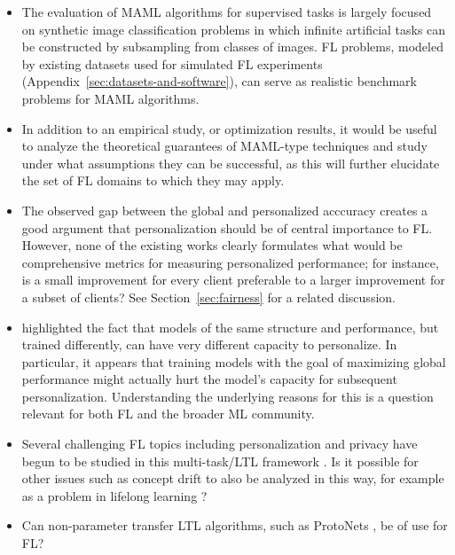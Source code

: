 \begin{itemize}
	\item The evaluation of MAML algorithms for supervised tasks is largely focused on synthetic image classification problems \citep{lake11omniglot,ravi17miniimagenet} in which infinite artificial tasks can be constructed by subsampling from classes of images. FL problems, modeled by existing datasets used for simulated FL experiments (Appendix~\ref{sec:datasets-and-software}), can serve as realistic benchmark problems for MAML algorithms.
	\item In addition to an empirical study, or optimization results, it would be useful to analyze the theoretical guarantees of MAML-type techniques and study under what assumptions they can be successful, as this will further elucidate the set of FL domains to which they may apply.
	\item The observed gap between the global and personalized acccuracy \citep{jiang2019improving} creates a good argument that personalization should be of central importance to FL. However, none of the existing works clearly formulates what would be comprehensive metrics for measuring personalized performance; for instance, is a small improvement for every client preferable to a larger improvement for a subset of clients? See Section~\ref{sec:fairness} for a related discussion.
	\item \citet{jiang2019improving} highlighted the fact that models of the same structure and performance, but trained differently, can have very different capacity to personalize. In particular, it appears that training models with the goal of maximizing global performance might actually hurt the model's capacity for subsequent personalization. Understanding the underlying reasons for this is a question relevant for both FL and the broader ML community.
	\item Several challenging FL topics including personalization and privacy have begun to be studied in this multi-task/LTL framework \cite{khodak19adaptive,jiang2019improving,li19dpmeta}. Is it possible for other issues such as concept drift to also be analyzed in this way, for example as a problem in lifelong learning \citep{silver13lifelong}?
	\item Can non-parameter transfer LTL algorithms, such as ProtoNets \citep{snell17protonets}, be of use for FL?
\end{itemize}


